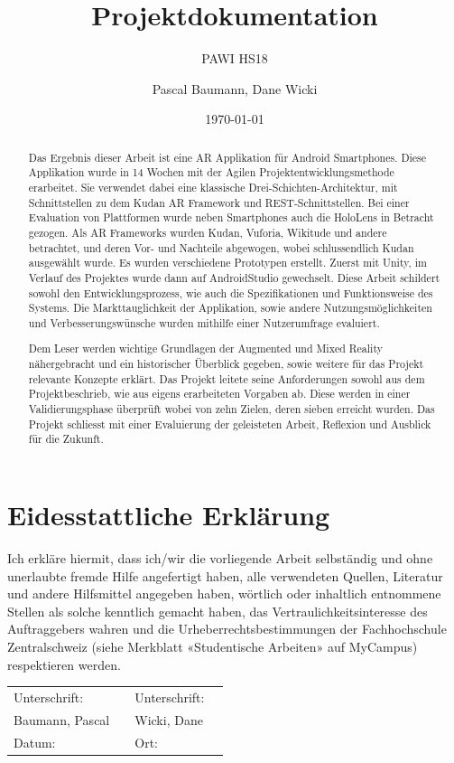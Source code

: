 \documentclass[a4paper]{scrreprt}
\title{Projektdokumentation}
\subtitle{PAWI HS18}
\author{Pascal Baumann, Dane Wicki}
\date{\today}
\begin{document}
\begin{titlepage}
\maketitle
\end{titlepage}



\chapter*{Eidesstattliche Erklärung}
Ich erkläre hiermit, dass ich/wir die vorliegende Arbeit selbständig und ohne unerlaubte fremde Hilfe angefertigt haben, alle verwendeten Quellen, Literatur und andere Hilfsmittel angegeben haben, wörtlich oder inhaltlich entnommene Stellen als solche kenntlich gemacht haben, das Vertraulichkeitsinteresse des Auftraggebers wahren und die Urheberrechtsbestimmungen der Fachhochschule Zentralschweiz (siehe Merkblatt «Studentische Arbeiten» auf MyCampus) respektieren werden.

\vspace{1em}

\renewcommand{\arraystretch}{2}
\begin{tabularx}{\textwidth}{XXXX}
	Unterschrift: & & Unterschrift: & \\ \cline{2-2}\cline{4-4}
	Baumann, Pascal & & Wicki, Dane & \\
	Datum: & & Ort: & \\
\end{tabularx}
\renewcommand{\arraystretch}{1}

\renewcommand{\abstractname}{Management Summary}
\begin{abstract}
	Das Ergebnis dieser Arbeit ist eine AR Applikation für Android Smartphones. Diese Applikation wurde in 14 Wochen mit der Agilen Projektentwicklungsmethode erarbeitet. Sie verwendet dabei eine klassische Drei-Schichten-Architektur, mit Schnittstellen zu dem Kudan AR Framework und REST-Schnittstellen. Bei einer Evaluation von Plattformen wurde neben Smartphones auch die HoloLens in Betracht gezogen. Als AR Frameworks wurden Kudan, Vuforia, Wikitude und andere betrachtet, und deren Vor- und Nachteile abgewogen, wobei schlussendlich Kudan ausgewählt wurde. Es wurden verschiedene Prototypen erstellt. Zuerst mit Unity, im Verlauf des Projektes wurde dann auf AndroidStudio gewechselt. Diese Arbeit schildert sowohl den Entwicklungsprozess, wie auch die Spezifikationen und Funktionsweise des Systems. Die Markttauglichkeit der Applikation, sowie andere Nutzungsmöglichkeiten und Verbesserungswünsche wurden mithilfe einer Nutzerumfrage evaluiert.
	
	Dem Leser werden wichtige Grundlagen der Augmented und Mixed Reality nähergebracht und ein historischer Überblick gegeben, sowie weitere für das Projekt relevante Konzepte erklärt. Das Projekt leitete seine Anforderungen sowohl aus dem Projektbeschrieb, wie aus eigens erarbeiteten Vorgaben ab. Diese werden in einer Validierungsphase überprüft wobei von zehn Zielen, deren sieben erreicht wurden. Das Projekt schliesst mit einer Evaluierung der geleisteten Arbeit, Reflexion und Ausblick für die Zukunft.
\end{abstract}
\end{document}
